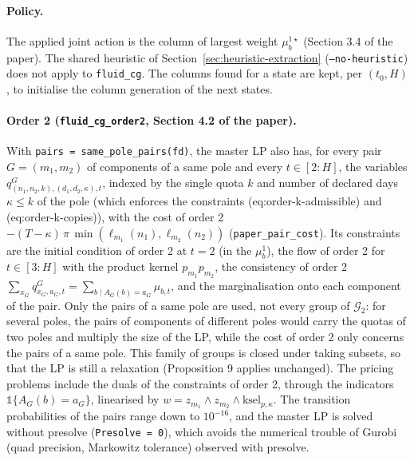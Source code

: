 \documentclass[11pt]{article}
\newcommand{\ksel}{\mathrm{ksel}}
\begin{document}
\paragraph{Policy.} The applied joint action is the column of largest weight $\mu^{1\star}_b$
(Section 3.4 of the paper). The shared heuristic of Section~\ref{sec:heuristic-extraction}
(\texttt{--no-heuristic}) does not apply to \texttt{fluid\_cg}. The columns found for a state
are kept, per $(t_0, H)$, to initialise the column generation of the next states.

\paragraph{Order 2 (\texttt{fluid\_cg\_order2}, Section 4.2 of the paper).} With
\texttt{pairs = same\_pole\_pairs(fd)}, the master LP also has, for every pair $G = (m_1, m_2)$ of
components of a same pole and every $t \in [2:H]$, the variables
$q^G_{(n_1,n_2,k),(d_1,d_2,\kappa),t}$, indexed by the single quota $k$ and number of declared
days $\kappa \le k$ of the pole (which enforces the constraints (eq:order-k-admissible) and
(eq:order-k-copies)), with the cost of order 2 $-(T - \kappa)\,\pi\,\min(\ell_{m_1}(n_1),
\ell_{m_2}(n_2))$ (\texttt{paper\_pair\_cost}). Its constraints are the initial condition of
order 2 at $t = 2$ (in the $\mu^1_b$), the flow of order 2 for $t \in [3:H]$ with the product
kernel $p_{m_1} p_{m_2}$, the consistency of order 2 $\sum_{x_G} q^G_{x_G,a_G,t} = \sum_{b \mid
A_G(b) = a_G} \mu_{b,t}$, and the marginalisation onto each component of the pair. Only the
pairs of a same pole are used, not every group of $\mathcal G_2$: for several poles, the pairs
of components of different poles would carry the quotas of two poles and multiply the size of
the LP, while the cost of order 2 only concerns the pairs of a same pole. This family of groups
is closed under taking subsets, so that the LP is still a relaxation (Proposition 9 applies
unchanged). The pricing problems include the duals of the constraints of order 2, through the
indicators $\mathbb 1\{A_G(b) = a_G\}$, linearised by $w = z_{m_1} \wedge z_{m_2} \wedge
\ksel_{p,\kappa}$. The transition probabilities of the pairs range down to $10^{-16}$, and the
master LP is solved without presolve (\texttt{Presolve = 0}), which avoids the numerical trouble
of Gurobi (quad precision, Markowitz tolerance) observed with presolve.
\end{document}
